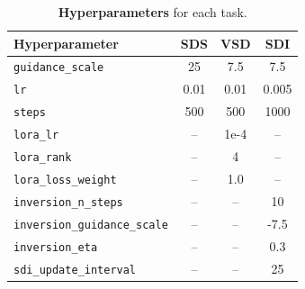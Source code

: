 \begin{table}[t]
  \centering
  \footnotesize
  \caption{\textbf{Hyperparameters} for each task.}
  \label{tab:hparams}
  \begin{tabular}{@{}lccc@{}}
    \toprule
    Hyperparameter & SDS & VSD & SDI \\
    \midrule
    \texttt{guidance\_scale}      & 25     & 7.5    & 7.5    \\
    \texttt{lr}                   & 0.01   & 0.01   & 0.005  \\
    \texttt{steps}                & 500    & 500    & 1000   \\
    \midrule
    \texttt{lora\_lr}             & --     & 1e-4   & --     \\
    \texttt{lora\_rank}           & --     & 4      & --     \\
    \texttt{lora\_loss\_weight}   & --     & 1.0    & --     \\
    \midrule
    \texttt{inversion\_n\_steps}  & --     & --     & 10     \\
    \texttt{inversion\_guidance\_scale} & -- & --   & -7.5   \\
    \texttt{inversion\_eta}       & --     & --     & 0.3    \\
    \texttt{sdi\_update\_interval}& --     & --     & 25     \\
    \bottomrule
  \end{tabular}
\end{table}
